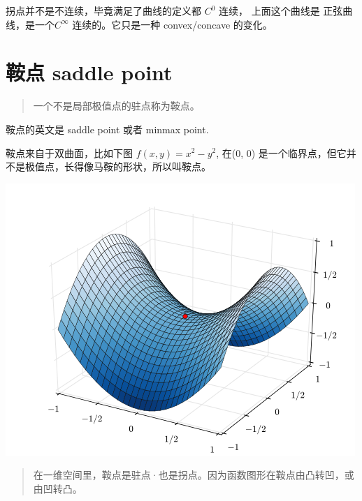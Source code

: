 \documentclass[
]{book}
\begin{document}
拐点并不是不连续，毕竟满足了曲线的定义都 \(C^0\) 连续， 上面这个曲线是 正弦曲线，是一个\(C^\infty\) 连续的。它只是一种 convex/concave 的变化。

\hypertarget{ux978dux70b9-saddle-point}{%
\section{鞍点 saddle point}\label{ux978dux70b9-saddle-point}}

\begin{quote}
一个不是局部极值点的驻点称为鞍点。
\end{quote}

鞍点的英文是 saddle point 或者 minmax point.

鞍点来自于双曲面，比如下图 \(f(x,y) = x^2 - y^2\), 在(0, 0) 是一个临界点，但它并不是极值点，长得像马鞍的形状，所以叫鞍点。

\includegraphics{images/Saddle_point.png}

\begin{quote}
在一维空间里，鞍点是驻点·也是拐点。因为函数图形在鞍点由凸转凹，或由凹转凸。
\end{quote}
\end{document}
